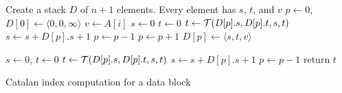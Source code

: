 \begin{algorithm}[H]
\SetAlgoNoLine
\LinesNumbered
{}
Create a stack $D$ of $n+1$ elements.  Every element has $s$, $t$, and $v$ \;
$p \gets 0$, $D[0] \gets \langle 0,0,\infty \rangle$ \;
 {
  $v \gets A[i]$ \; $s \gets 0$ \; $t \gets 0$ \;
   {
    $t \gets {\cal T}(D[p].s, D[p].t, s, t)$ \;
    $s \gets s + D[p].s + 1$ \;
    $p \gets p - 1$ \;
  }
  $p \gets p + 1$ \;
  $D[p] \gets \langle s,t,{v}\rangle$ \;
}

$s \gets 0$, $t \gets 0$ \;
 {
  $t \gets {\cal T}(D[p].s, D[p].t, s, t)$ \;
  $s \gets s + D[p].s + 1$ \;
  $p \gets p - 1$ \;
}
return $t$ \;

\caption{Catalan index computation for a data block}
\label{alg:cartesian-encode-offline}
\end{algorithm}
